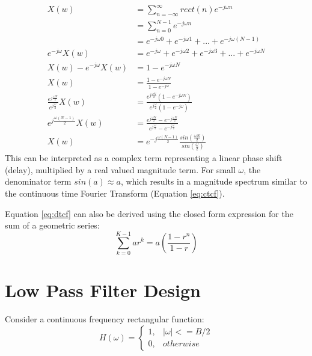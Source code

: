 \documentclass{article}
\begin{document}
\begin{equation} \label{eq:dtcf}
\begin{split}
                     X(w) &= \sum_{n=-\infty}^{\infty} rect(n) e^{-j \omega n} \\
                          &= \sum_{n=0}^{N-1} e^{-j \omega n} \\
                          &= e^{-j \omega 0} + e^{-j \omega 1} + ... + e^{-j \omega (N-1)} \\
       e^{-j \omega} X(w) &= e^{-j \omega} + e^{-j \omega 2} + e^{-j \omega 3} + ... + e^{-j \omega N} \\
X(w) - e^{-j \omega} X(w) &= 1 - e^{-j \omega N} \\
                     X(w) &= \frac{1 - e^{-j \omega N}}{1 - e^{-j \omega}} \\
\frac{e^{j \frac{\omega N}{2}}}{e^{j \frac{\omega}{2}}} X(w) &= \frac{e^{j \frac{\omega N}{2}}(1 - e^{-j \omega N})}{e^{j \frac{\omega}{2}}(1 - e^{-j \omega})} \\
e^{j \frac{\omega (N-1)}{2}} X(w) &= \frac{e^{j \frac{\omega N}{2}} - e^{-j \frac{\omega N}{2}}}{e^{j \frac{\omega}{2}} - e^{-j \frac{\omega}{2}}} \\
X(w) &= e^{-j \frac{\omega (N-1)}{2}} \frac{sin(\frac{\omega N}{2})}{sin(\frac{\omega}{2})}
\end{split}
\end{equation}
This can be interpreted as a complex term representing a linear phase shift (delay), multiplied by a real valued magnitude term.  For small $\omega$, the denominator term $sin(a) \approx a$, which results in a magnitude spectrum similar to the continuous time Fourier Transform (Equation \ref{eq:ctcf}).

Equation \ref{eq:dtcf} can also be derived using the closed form expression for the sum of a geometric series:
\begin{equation} \label{eq_geosum}
\sum_{k=0}^{K-1} ar^k = a \left( \frac{1-r^n}{1-r} \right)
\end{equation}

\section {Low Pass Filter Design}

Consider a continuous frequency rectangular function:
\begin{equation} \label{eq:h_omega}
H(\omega)= 
	\begin{cases}
      1, & |\omega| <= B/2 \\
      0, & otherwise
	\end{cases}
\end{equation}
\end{document}
